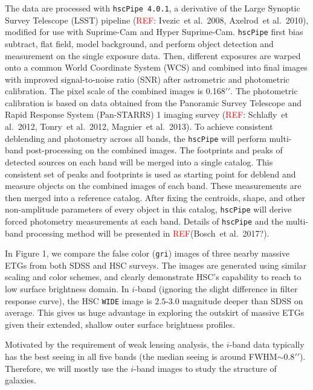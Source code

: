 \documentclass[preprint]{aastex}
\def\arcsec{{\prime\prime}}
\def\etal{{\ et al.~}}
\newcommand{\addref}{{\textcolor{red}{REF}}}
\begin{document}
\begin{CJK*}{UTF8}{gbsn}
    The data are processed with \texttt{hscPipe 4.0.1}, a derivative of the Large 
    Synoptic Survey Telescope (LSST) pipeline (\addref: Ivezic\etal 2008,
    Axelrod\etal 2010), modified for use with Suprime-Cam and Hyper Suprime-Cam.  
    \texttt{hscPipe} first bias subtract, flat field, model background, and 
    perform object detection and measurement on the single exposure data. 
    Then, different exposures are warped onto a common World Coordinate System 
    (WCS) and combined into final images with improved signal-to-noise ratio 
    (SNR) after astrometric and photometric calibration.  
    The pixel scale of the combined images is 0.168$\arcsec$.
    The photometric calibration is based on data obtained from the Panoramic 
    Survey Telescope and Rapid Response System (Pan-STARRS) 1 imaging survey 
    (\addref: Schlafly\etal 2012, Tonry\etal 2012, Magnier\etal 2013). 
    To achieve consistent deblending and photometry across all bands, the 
    \texttt{hscPipe} will perform multi-band post-processing on the combined 
    images.  
    The footprints and peaks of detected sources on each band will be 
    merged into a single catalog.    
    This consistent set of peaks and footprints is used as starting point 
    for deblend and measure objects on the combined images of each band.  
    These measurements are then merged into a reference catalog. 
    After fixing the centroids, shape, and other non-amplitude parameters 
    of every object in this catalog, \texttt{hscPipe} will derive forced 
    photometry measurements at each band. 
    Details of \texttt{hscPipe} and the multi-band processing method will 
    be presented in \addref (Bosch\etal 2017?).     
          
    In Figure 1, we compare the false color ({\tt gri}) images of three nearby 
    massive ETGs from both SDSS and HSC surveys.  
    The images are generated using similar scaling and color schemes, and clearly 
    demonstrate HSC's capability to reach to low surface brightness domain.  
    In $i$-band (ignoring the slight difference in filter response curve), the 
    HSC \texttt{WIDE} image is $2.5$-$3.0$ magnitude deeper than SDSS on average.  
    This gives us huge advantage in exploring the outskirt of massive ETGs given 
    their extended, shallow outer surface brightness profiles. 
    
    Motivated by the requirement of weak lensing analysis, the $i$-band data 
    typically has the best seeing in all five bands (the median seeing is around 
    FWHM$\sim 0.8\arcsec$).  Therefore, we will mostly use the $i$-band images
    to study the structure of galaxies. 
    

\end{CJK*}
\end{document}
